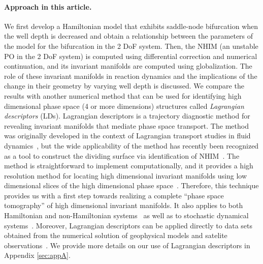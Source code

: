 \documentclass{ws-ijbc}
\begin{document}
\paragraph*{\bf Approach in this article.}
We first develop a Hamiltonian model that exhibits saddle-node bifurcation when the well depth is decreased and obtain a relationship between the parameters of the model for the bifurcation in the 2 DoF system. Then, the NHIM (an unstable PO in the 2 DoF system) is computed using differential correction and numerical continuation, and its invariant manifolds are computed using globalization. The role of these invariant manifolds in reaction dynamics and the implications of the change in their geometry by varying well depth is discussed. We compare the results with another numerical method that can be used for identifying high dimensional phase space (4 or more dimensions) structures called \textit{Lagrangian descriptors} (LDs). Lagrangian descriptors is a trajectory diagnostic method for revealing invariant manifolds that mediate phase space transport. The method was originally developed in the context of Lagrangian transport studies in fluid dynamics~\cite{madrid2009}, but the wide applicability of the method has recently been recognized as a tool to construct the dividing surface via identification of NHIM~\cite{craven2016deconstructing, craven2015lagrangian, craven2017lagrangian, revuelta2019unveiling, junginger2017chemical, feldmaier2017obtaining, patra2018detecting}. The method is straightforward to implement computationally, and it provides a high resolution method for locating high dimensional invariant manifolds using low dimensional slices of the high dimensional phase space~\cite{demian2017,Naik2019a,Naik2019b}. Therefore, this technique provides us with a first step towards realizing a complete ``phase space tomography'' of high dimensional invariant manifolds. It also applies to both Hamiltonian and non-Hamiltonian systems~\cite{lopesino2017} as well as to stochastic dynamical systems~\cite{balibrea2016lagrangian}. Moreover, Lagrangian descriptors can be applied directly to data sets obtained from the numerical solution of geophysical models and satelite observations~\cite{gg2016,ramos2018,balibrea2019}. We provide more details on our use of Lagrangian descriptors in Appendix \ref{sec:appA}.
\end{document}
